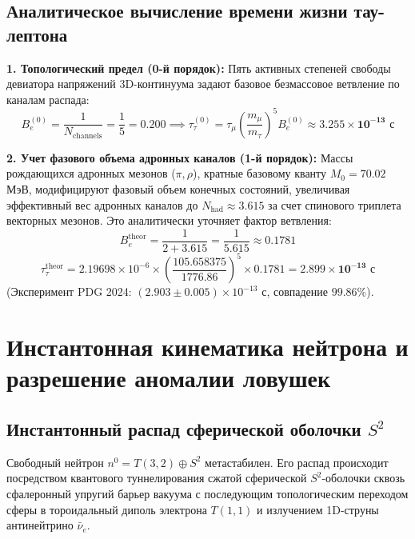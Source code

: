 \documentclass[12pt,a4paper]{article}
\begin{document}
\subsection{Аналитическое вычисление времени жизни тау-лептона}
\textbf{1. Топологический предел (0-й порядок):}
Пять активных степеней свободы девиатора напряжений 3D-континуума задают базовое безмассовое ветвление по каналам распада:
\begin{equation}
	B_e^{(0)} = \frac{1}{N_{\text{channels}}} = \frac{1}{5} = \mathbf{0.200} \implies \tau_\tau^{(0)} = \tau_\mu \left(\frac{m_\mu}{m_\tau}\right)^5 B_e^{(0)} \approx \mathbf{3.255 \times 10^{-13} \text{ с}}
\end{equation}

\textbf{2. Учет фазового объема адронных каналов (1-й порядок):}
Массы рождающихся адронных мезонов ($\pi, \rho$), кратные базовому кванту $M_0 = 70.02$ МэВ, модифицируют фазовый объем конечных состояний, увеличивая эффективный вес адронных каналов до $N_{\text{had}} \approx 3.615$ за счет спинового триплета векторных мезонов. Это аналитически уточняет фактор ветвления:
\begin{equation}
	B_e^{\text{theor}} = \frac{1}{2 + 3.615} = \frac{1}{5.615} \approx \mathbf{0.1781}
\end{equation}
\begin{equation}
	\tau_\tau^{\text{theor}} = 2.19698 \times 10^{-6} \times \left( \frac{105.658375}{1776.86} \right)^5 \times 0.1781 = \mathbf{2.899 \times 10^{-13} \text{ с}}
\end{equation}
(Эксперимент PDG 2024: $(2.903 \pm 0.005) \times 10^{-13}$ с, совпадение $99.86\%$).

\section{Инстантонная кинематика нейтрона и разрешение аномалии ловушек}

\subsection{Инстантонный распад сферической оболочки $S^2$}
Свободный нейтрон $n^0 = T(3,2) \oplus S^2$ метастабилен. Его распад происходит посредством квантового туннелирования сжатой сферической $S^2$-оболочки сквозь сфалеронный упругий барьер вакуума с последующим топологическим переходом сферы в тороидальный диполь электрона $T(1,1)$ и излучением 1D-струны антинейтрино $\bar{\nu}_e$.
\end{document}
